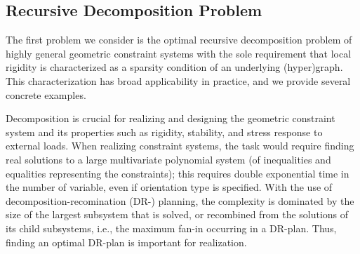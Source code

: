
\subsection{Recursive Decomposition Problem}
The first problem we consider is the optimal recursive decomposition problem of highly general geometric constraint systems with the sole requirement that local rigidity is characterized as a sparsity condition of an underlying (hyper)graph. This characterization has broad applicability in practice, and we provide several concrete examples.









Decomposition is crucial for realizing and designing the geometric constraint system and its properties such as rigidity, stability, and stress response to external loads. When realizing constraint systems, the task would require finding real solutions to a large multivariate polynomial system (of inequalities and equalities representing the constraints); this requires double exponential time in the number of variable, even if orientation type is specified.
With the use of decomposition-recomination (DR-) planning, the complexity is dominated by the size of the largest subsystem that is solved, or recombined from the solutions of its child subsystems, i.e., the maximum fan-in occurring in a DR-plan. Thus, finding an optimal DR-plan is important for realization.




